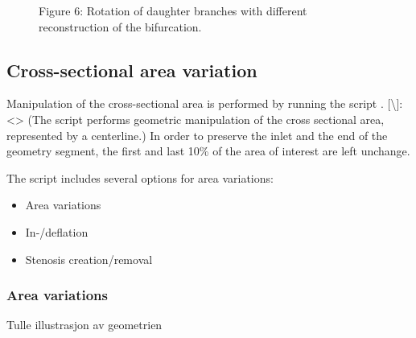 \documentclass[letterpaper,10pt,english]{sphinxmanual}
\begin{document}
%
\begin{sphinxVerbatim}[commandchars=\\\{\}]
   \PYG{p}{[}\PYG{p}{]}  \PYG{p}{[}\PYG{p}{]}  \PYG{p}{[}\PYG{p}{]}  
\end{sphinxVerbatim}

\begin{figure}[htbp]
\centering
\capstart

\noindent{}
\caption{Figure 6: Rotation of daughter branches with different reconstruction of the bifurcation.}\label{\detokenize{getting_started:id6}}\end{figure}


\subsection{Cross-sectional area variation}
\label{\detokenize{getting_started:cross-sectional-area-variation}}
Manipulation of the cross-sectional area is performed by running the script .
{[}\textbackslash{}{]}: \textless{}\textgreater{} (The script performs geometric manipulation of the cross sectional area, represented by a centerline.)
In order to preserve the inlet and the end of the geometry segment, the first and last 10\% of the area of interest are left unchange.

The script  includes several options for area variations:
\begin{itemize}
\item {} 
Area variations

\item {} 
In-/deflation

\item {} 
Stenosis creation/removal

\end{itemize}


\subsubsection{Area variations}
\label{\detokenize{getting_started:area-variations}}
Tulle illustrasjon av geometrien
\end{document}
